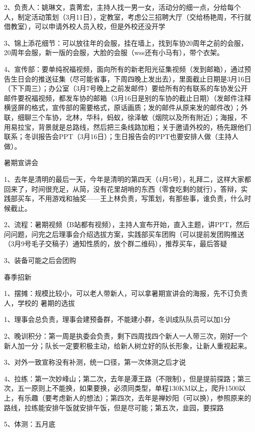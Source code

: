 \documentclass{ctexbook}
\begin{document}
2、负责人：姚琳文，袁菁宏，主持人找一男一女，活动分的细一点，分给每个人，制定活动策划（3月11日），定教室，考虑公三招聘大厅（交给杨艳周，不行就借教室），可以申请外校人员入校，但是外校还没开学

3、锦上添花细节：可以放往年的会服，挂在墙上，找到车协20周年之前的会服，20周年会服，新一版的会服，大脸的会服（wss还有小马有），带个衣架。

4、宣传部：要单纯祝福视频，面向所有的新老阳光征集视频（发到邮箱），通过预告生日会的推送征集（尽可能省事，下周四晚上发出去），里面截止日期是3月16日（下下周三）；办公室（3月7号晚上之前发邮件）要给所有的有联系的车协发公开邮件要祝福视频，都发车协的邮箱（3月16日是别的车协的截止日期）（发邮件注释横竖屏的格式，宣传部的需要格式，原话画质；发的邮件从原来发的邮件改）；外联，细聊三个车协，北林，华科，蚂蚁，徐泽敏（烟院以及所有附近）；海报，不用易拉宝，背景就是总路线，然后把三条线路加粗；关于邀请外校的，杨先跟他们联系；冬训报告会PPT（3月16日）；生日报告会的PPT也要安排人做（主持人做）。

暑期宣讲会

1、去年是清明的最后一天，今年是清明的第四天（4月5号），礼拜二，这样大家都回来了，时间很充足，从简，没有花里胡哨的东西（零食吃剩的就行），答辩，实践部买车，不用游戏和抽奖——王上林负责，写策划，有那些事，谁负责，什么时候截止。

2、流程：暑期视频（B站都有视频），主持人宣布开始，直入主题，讲PPT，然后问问题，问完之后理事会介绍选拔方案，实践部买车团购（可以提前发团购推送（3月9号毛子交稿子）通知性质的，放个群二维码），推荐买车，最后答疑

3、装备可能之后会团购

春季招新

1、摆摊：规模比较小，可以老人带新人，可以拿暑期宣讲会的海报，先不订负责人，学校的
暑期的选拔

1、理事会总负责，理事会建预备群，不能建小群，冬训成队队员可以加1分

2、晚训积分：第一周是执委会负责，剩下四周找四个新人一人带三次，刚好一个新人加一分；队长一定要积极主动，给新人树立好的队长形象，让新人重视起来。

3、对外一致宣称没有补测，统一口径，第一次体测之后才说

4、拉练：第一次妙峰山；第二次，去年是潭王路（不限制），但是提前探路；第三次，五一原则上不能换，如果要换，必须同类型，单程130KM以上，爬升1500以上，有乐趣（要考虑新人的想法）；第四次，去年是禅妙阳（可以换），参照原来的路线，拉练能安排午饭就安排午饭，但是尽可能；第五次，韭园，要探路

5、体测：五月底
\end{document}
